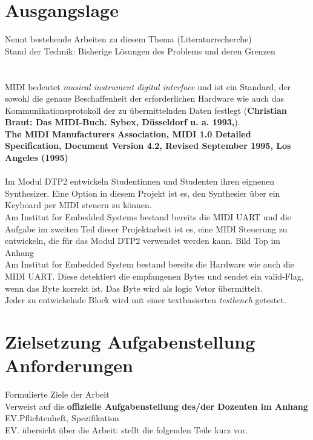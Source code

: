 \section{Ausgangslage}\label{sect.einleitung_ausgangslage}
Nennt bestehende Arbeiten zu diesem Thema (Literaturrecherche)\\
Stand der Technik: Bisherige Lösungen des Problems und deren Grenzen\\
\\
\\
MIDI bedeutet \textit{musical instrument digital interface} und ist ein Standard, der sowohl die genaue Beschaffenheit der erforderlichen Hardware wie auch das Kommunikationsprotokoll der zu übermittelnden Daten festlegt (\textbf{Christian Braut: Das MIDI-Buch. Sybex, Düsseldorf u. a. 1993,}).\\
\textbf{The MIDI Manufacturers Association, MIDI 1.0 Detailed Specification, Document Version 4.2, Revised September 1995, Los Angeles (1995) }\\
\\
Im Modul DTP2 entwickeln Studentinnen und Studenten ihren eignenen Synthesizer. Eine Option in diesem Projekt ist es, den Synthesier über ein Keyboard per MIDI steuern zu können. \\
Am Institut for Embedded Systems bestand bereits die MIDI UART und die Aufgabe im zweiten Teil dieser Projektarbeit ist es, eine MIDI Steuerung zu entwickeln, die für das Modul DTP2 verwendet werden kann. Bild Top im Anhang\\
Am Institut for Embedded System bestand bereits die Hardware wie auch die MIDI UART. Diese detektiert die empfangenen Bytes und sendet ein valid-Flag, wenn das Byte korrekt ist. Das Byte wird als logic Vetor übermittelt.\\

Jeder zu entwickelnde Block wird mit einer textbasierten \textit{testbench} getestet. 

\section{Zielsetzung Aufgabenstellung Anforderungen}\label{sect.einleitung_ziele}
Formulierte Ziele der Arbeit\\
Verweist auf die \textbf{offizielle Aufgabenstellung des/der Dozenten im Anhang}\\
EV.Pflichtenheft, Spezifikation\\
EV. übersicht über die Arbeit: stellt die folgenden Teile kurz vor.\\


